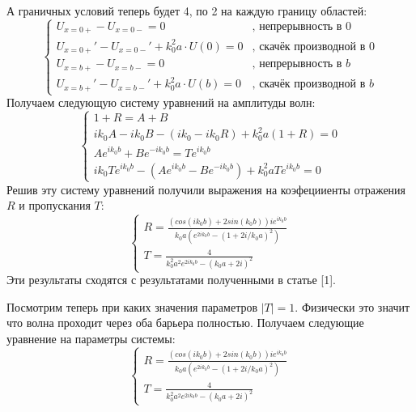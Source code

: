 \documentclass[11pt]{article}    %
\begin{document}
А граничных условий теперь будет 4, по 2 на каждую границу областей:
\begin{equation}
    \begin{cases}
        U_{x=0+} - U_{x=0-} = 0 & \text{, непрерывность в $0$}
        \\
        U_{x=0+}' - U_{x=0-}' + k_0^2 a \cdot U(0) = 0 & \text{, скачёк производной в $0$}
        \\
        U_{x=b+} - U_{x=b-} = 0 & \text{, непрерывность в $b$}
        \\
        U_{x=b+}' - U_{x=b-}' + k_0^2 a \cdot U(b) = 0 & \text{, скачёк производной в $b$}
    \end{cases}
\end{equation}
Получаем следующую систему уравнений на амплитуды волн:
\begin{equation}
    \begin{cases}
        1 + R = A + B %
        \\
        ik_{0}A - ik_{0}B - (ik_0 - ik_0R) + k_0^2 a (1 + R) = 0 %
        \\
        Ae^{ik_{0}b} + Be^{-ik_{0}b} = Te^{ik_{0}b} %
        \\
        ik_{0}Te^{ik_{0}b} - (Ae^{ik_{0}b} - Be^{-ik_{0}b}) + k_0^2 a Te^{ik_{0}b} = 0 %
    \end{cases}
\end{equation}
Решив эту систему уравнений получили выражения на коэфецииенты отражения $R$ и пропускания $T$:
\begin{equation}
    \begin{cases}
        R = \frac{(cos(ik_{0}b) + 2sin(k_0b))ie^{ik_{0}b}}{k_0a(e^{2ik_{0}b}-(1 + 2i/k_0a)^2)}
        \\
        T = \frac{4}{k_0^2a^2e^{2ik_{0}b}-(k_0a + 2i)^2}
    \end{cases}
\end{equation}
Эти результаты сходятся с результатами полученными в статье [1].
\par %
Посмотрим теперь при каких значения параметров $|T| = 1$. Физически это значит что волна проходит через оба барьера полностью.
Получаем следующие уравнение на параметры системы:
\begin{equation}
    \begin{cases}
        R = \frac{(cos(ik_{0}b) + 2sin(k_0b))ie^{ik_{0}b}}{k_0a(e^{2ik_{0}b}-(1 + 2i/k_0a)^2)}
        \\
        T = \frac{4}{k_0^2a^2e^{2ik_{0}b}-(k_0a + 2i)^2}
    \end{cases}
\end{equation}
\end{document}
